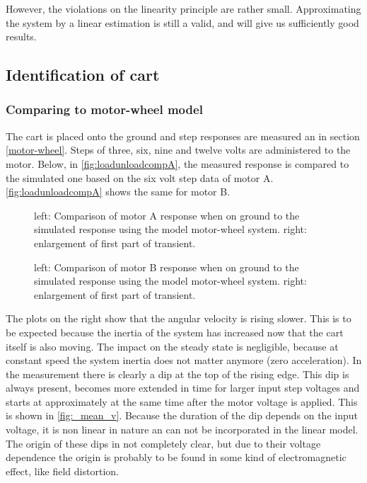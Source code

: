 \documentclass[a4paper]{article}
\newcommand{\newpar}{\vspace{.3cm}\noindent}
\begin{document}
\newpar
However, the violations on the linearity principle are rather small. Approximating the system by a linear estimation is still a valid, and will give us sufficiently good results. 

\subsection{Identification of cart}
\subsubsection{Comparing to motor-wheel model}
The cart is placed onto the ground and step responses are measured an in section \ref{motor-wheel}. Steps of three, six, nine and twelve volts are administered to the motor. Below, in \autoref{fig:loadunloadcompA}, the measured response is compared to the simulated one based on the six volt step data of motor A. \autoref{fig:loadunloadcompA} shows the same for motor B.

\begin{figure}[H]
    \caption{left: Comparison of motor A response when on ground to the simulated response using the model motor-wheel system. right: enlargement of first part of transient.}
    \label{fig:loadunloadcompA}
\end{figure}

\begin{figure}[H]
    \caption{left: Comparison of motor B response when on ground to the simulated response using the model motor-wheel system. right: enlargement of first part of transient.}
    \label{fig:loadunloadcompB}
\end{figure}

\newpar
The plots on the right show that the angular velocity is rising slower. This is to be expected because the inertia of the system has increased now that the cart itself is also moving. The impact on the steady state is negligible, because at constant speed the system inertia does not matter anymore (zero acceleration). In the measurement there is clearly a dip at the top of the rising edge. This dip is always present, becomes more extended in time for larger input step voltages and starts at approximately at the same time after the motor voltage is applied. This is shown in \autoref{fig:_mean_v}. Because the duration of the dip depends on the input voltage, it is non linear in nature an can not be incorporated in the linear model. The origin of these dips in not completely clear, but due to their voltage dependence the origin is probably to be found in some kind of electromagnetic effect, like field distortion.
\end{document}
